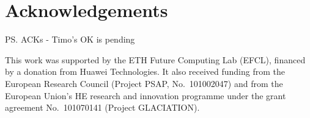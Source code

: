 \section*{Acknowledgements}
\label{sec:ack}

\ps{ACKs - Timo's OK is pending}

This work was supported by the ETH Future Computing Lab (EFCL), financed by a donation from Huawei Technologies.
It also received funding from the European Research Council
 (Project PSAP,
No.~101002047) and from the European Union's HE research 
and innovation programme under the grant agreement No.~101070141 (Project GLACIATION).

